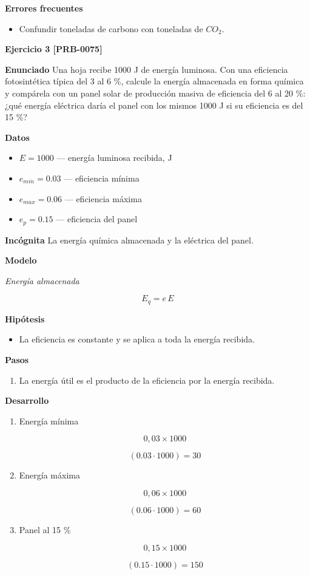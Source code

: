 \documentclass{book}
\begin{document}
\noindent\textbf{Errores frecuentes}
\begin{itemize}
\item Confundir toneladas de carbono con toneladas de \(CO_{2}\).
\end{itemize}

\noindent\textbf{Ejercicio 3 [PRB-0075]}

\noindent\textbf{Enunciado}
Una hoja recibe 1000 J de energía luminosa. Con una eficiencia fotosintética típica del 3 al 6 \%, calcule la energía almacenada en forma química y compárela con un panel solar de producción masiva de eficiencia del 6 al 20 \%: ¿qué energía eléctrica daría el panel con los mismos 1000 J si su eficiencia es del 15 \%?


\noindent\textbf{Datos}
\begin{itemize}
\item $E = 1000$ — energía luminosa recibida, J
\item $e_{min} = 0.03$ — eficiencia mínima
\item $e_{max} = 0.06$ — eficiencia máxima
\item $e_{p} = 0.15$ — eficiencia del panel
\end{itemize}

\noindent\textbf{Incógnita}
La energía química almacenada y la eléctrica del panel.


\noindent\textbf{Modelo}

\noindent\textit{Energía almacenada}

\[
E_q = e\,E
\]

\noindent\textbf{Hipótesis}
\begin{itemize}
\item La eficiencia es constante y se aplica a toda la energía recibida.
\end{itemize}

\noindent\textbf{Pasos}
\begin{enumerate}
\item
La energía útil es el producto de la eficiencia por la energía recibida.

\end{enumerate}

\noindent\textbf{Desarrollo}
\begin{enumerate}
\item
Energía mínima


\[
0,03 \times 1000
\]

\[
\left(0.03\cdot 1000\right) = 30
\]
\item
Energía máxima


\[
0,06 \times 1000
\]

\[
\left(0.06\cdot 1000\right) = 60
\]
\item
Panel al 15 \%


\[
0,15 \times 1000
\]

\[
\left(0.15\cdot 1000\right) = 150
\]
\end{enumerate}
\end{document}
